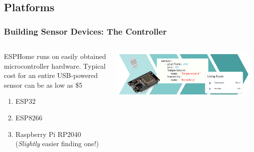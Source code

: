 \documentclass[aspectratio=169]{beamer}
\begin{document}
\subsection{Platforms}
\begin{frame}[fragile]
  \frametitle{Building Sensor Devices: The Controller}
  \begin{columns}[]
    \begin{column}[T]{0.45\paperwidth}
      ESPHome runs on easily obtained microcontroller hardware.
      \vfill
      Typical cost for an entire USB-powered sensor can be as low as \$5
      \begin{enumerate}%
        \item{ESP32}
        \item{ESP8266}
        \item{Raspberry Pi RP2040 \tiny{(\emph{Slightly} easier finding one!)}}
      \end{enumerate}
    \end{column}
    \begin{column}[T]{0.45\paperwidth}
      \includegraphics[width=0.45\paperwidth,keepaspectratio]{images/esp.png}
    \end{column}
  \end{columns}
\end{frame}

\end{document}
